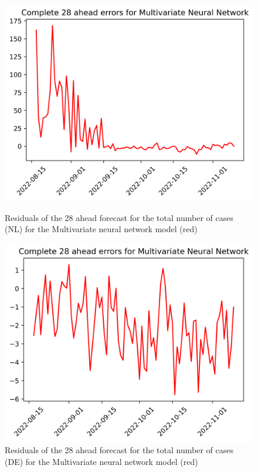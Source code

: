 \begin{figure}

\begin{minipage}{.45\textwidth}
  \centering
  \includegraphics[width=\linewidth]{pics/28_ah/28_ahead_errors_Multivariate Neural Network.png}
  \caption{Residuals of the 28 ahead forecast for the total number of cases (NL) for the Multivariate neural network model (red)}
  \label{fig:tot_cases_error_28_mvnn}
\end{minipage}
\begin{minipage}{.45\textwidth}
  \centering
  \includegraphics[width=\linewidth]{pics/28_ah/DE_28_ahead_errors_Multivariate Neural Network.png}
  \caption{Residuals of the 28 ahead forecast for the total number of cases (DE) for the Multivariate neural network model (red)}
  \label{fig:tot_cases_error_28_mvnn_DE}
\end{minipage}

\end{figure}
